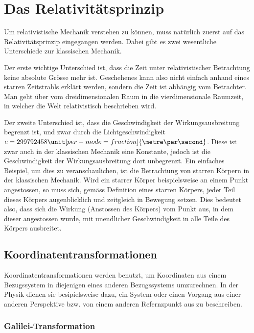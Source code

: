 
\section{Das Relativitätsprinzip 
\label{relativ:section:relativistik}}

Um relativistische Mechanik verstehen zu können,
muss natürlich zuerst auf das Relativitätsprinzip eingegangen werden.
Dabei gibt es zwei wesentliche Unterschiede zur klassischen Mechanik.

Der erste wichtige Unterschied ist, dass die Zeit unter relativistischer Betrachtung keine absolute Grösse mehr ist.
Geschehenes kann also nicht einfach anhand eines starren Zeitstrahls erklärt werden, sondern die Zeit ist abhängig vom Betrachter.
Man geht über vom dreidimensionalen Raum in die vierdimensionale Raumzeit, in welcher die Welt relativistisch beschrieben wird.

Der zweite Unterschied ist,
dass die Geschwindigkeit der Wirkungsausbreitung begrenzt ist,
und zwar durch die Lichtgeschwindigkeit
\(c=299792458\unit[per-mode = fraction]{\metre\per\second}\).
Diese ist zwar auch in der klassischen Mechanik eine Konstante,
jedoch ist die Geschwindigkeit der Wirkungsausbreitung dort unbegrenzt.
Ein einfaches Beispiel, um dies zu veranschaulichen,
ist die Betrachtung von starren Körpern in der klassischen Mechanik.
Wird ein starrer Körper beispielsweise an einem Punkt angestossen,
so muss sich, gemäss Definition eines starren Körpers,
jeder Teil dieses Körpers augenblicklich und zeitgleich in Bewegung setzen.
Dies bedeutet also, dass sich die Wirkung (Anstossen des Körpers)
vom Punkt aus, in dem dieser angestossen wurde,
mit unendlicher Geschwindigkeit in alle Teile des Körpers ausbreitet.


\subsection{Koordinatentransformationen 
\label{relativ:section:koordtrafo}}

Koordinatentransformationen werden benutzt,
um Koordinaten aus einem Bezugssystem in diejenigen eines anderen Bezugssystems umzurechnen.
In der Physik dienen sie besipielsweise dazu,
ein System oder einen Vorgang aus einer anderen Perspektive bzw.
von einem anderen Refernzpunkt aus zu beschreiben.

\subsubsection{Galilei-Transformation 
\label{relativ:section:galilei-trafo}}

